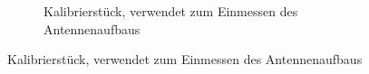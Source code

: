 \begin{figure}[h]
\begin{subfigure}[h]{0.4\textwidth}
                 \caption{Kalibrierstück, verwendet zum Einmessen des Antennenaufbaus}
                 \label{fig:calib_piece}
         \end{subfigure}
         \label{fig:Calibration_Tools}
\end{figure}
 